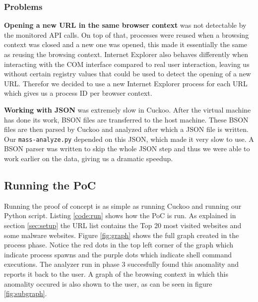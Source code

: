 \subsubsection{Problems}
\label{99problems}

\textbf{Opening a new URL in the same browser context} was not detectable by the monitored API calls. On top of that, processes were reused when a browsing context was closed and a new one was opened, this made it essentially the same as reusing the browsing context. Internet Explorer also behaves differently when interacting with the COM interface compared to real user interaction, leaving us without certain registry values that could be used to detect the opening of a new URL. Therefor we decided to use a new Internet Explorer process for each URL which gives us a process ID per browser context.

\textbf{Working with JSON} was extremely slow in Cuckoo. After the virtual machine has done its work, BSON files are transferred to the host machine. These BSON files are then parsed by Cuckoo and analyzed after which a JSON file is written. Our \texttt{mass-analyze.py} depended on this JSON, which made it very slow to use. A BSON parser was written to skip the whole JSON step and thus we were able to work earlier on the data, giving us a dramatic speedup.

\subsection{Running the PoC}

Running the proof of concept is as simple as running Cuckoo and running our Python script. Listing \ref{code:run} shows how the PoC is run. As explained in section \ref{sec:setup} the URL list contains the Top 20 most visited websites and some malware websites. Figure \ref{fig:graph} shows the full graph created in the process phase. Notice the red dots in the top left corner of the graph which indicate process spawns and the purple dots which indicate shell command executions. The analyzer run in phase 3 succesfully found this anomality and reports it back to the user. A graph of the browsing context in which this anomality occured is also shown to the user, as can be seen in figure \ref{fig:subgraph}.

